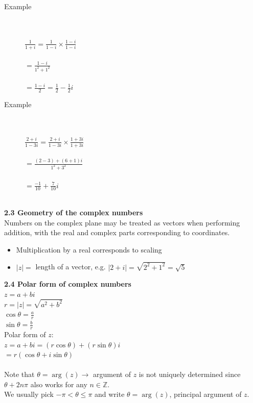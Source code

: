 \documentclass[]{article}
\begin{document}
		\begin{description}
			\item[Example]\hfill\\\\
			$\frac{1}{1+i}=\frac{1}{1-i}\times\frac{1-i}{1-i}$\\\\
			$=\frac{1-i}{1^2+1^2}$\\\\
			$=\frac{1-i}{2}=\frac{1}{2}-\frac{1}{2}i$
			\item[Example]\hfill\\\\
			$\frac{2+i}{1-3i}=\frac{2+i}{1-3i}\times\frac{1+3i}{1+3i}$\\\\
			$=\frac{(2-3)+(6+1)i}{1^2+3^2}$\\\\
			$=\frac{-1}{10}+\frac{7}{10}i$\\\\
		\end{description}
		
		\noindent\large{\bf 2.3 Geometry of the complex numbers}\\
		\normalsize Numbers on the complex plane may be treated as vectors when performing addition, with the real and complex parts corresponding to coordinates.
		\begin{itemize}
			\item Multiplication by a real corresponds to scaling
			\item $|z|=$ length of a vector, e.g. $|2+i|=\sqrt{2^2+1^2}=\sqrt{5}$
		\end{itemize}
		
		\noindent\large{\bf 2.4 Polar form of complex numbers}\\
		\normalsize $z=a+bi$\\
		$r=|z|=\sqrt{a^2+b^2}$\\
		$\cos\theta=\frac{a}{r}$\\
		$\sin\theta=\frac{b}{r}$\\
		Polar form of $z$:\\
		$z=a+bi=(r\cos\theta)+(r\sin\theta)i$\\
		$=r(\cos\theta+i\sin\theta)$\\\\
		
		Note that $\theta=\arg(z)\rightarrow$ argument of $z$ is not uniquely determined since $\theta+2n\pi$ also works for any $n\in\mathbb{Z}$.\\
		We usually pick $-\pi<\theta\le\pi$ and write $\theta=\arg(z)$, principal argument of $z$.\\
		
\end{document}
